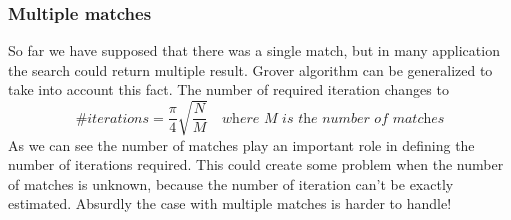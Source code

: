 \documentclass[main.tex]{subfiles}
\theoremstyle{definition}
\begin{document}
\subsubsection{Multiple matches}
So far we have supposed that there was a single match, but in many application the search could return multiple result. Grover algorithm can be generalized to take into account this fact.
The number of required iteration changes to
\begin{equation}
\textit{\# iterations}=\frac{\pi}{4}\sqrt{\frac{N}{M}}\quad\textit{where M is the number of matches}
\end{equation}
As we can see the number of matches play an important role in defining the number of iterations required. This could create some problem when the number of matches is unknown, because the number of iteration can't be exactly estimated. Absurdly the case with multiple matches is harder to handle!
\end{document}
